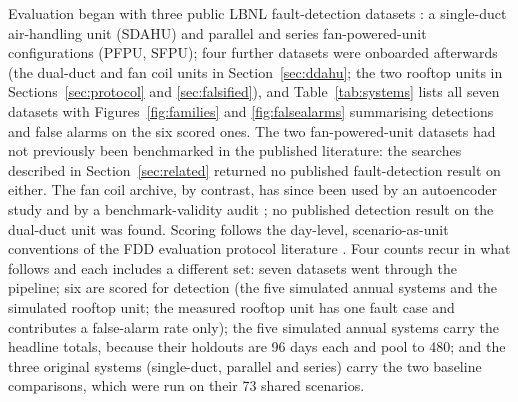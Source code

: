 \documentclass[11pt,letterpaper]{article}
\begin{document}
Evaluation began with three public LBNL fault-detection datasets \cite{granderson2020lbnlfdddata,granderson2023lbnlfdddata}: a single-duct air-handling unit (SDAHU) and parallel and series fan-powered-unit configurations (PFPU, SFPU); four further datasets were onboarded afterwards (the dual-duct and fan coil units in Section~\ref{sec:ddahu}; the two rooftop units in Sections~\ref{sec:protocol} and \ref{sec:falsified}), and Table~\ref{tab:systems} lists all seven datasets with Figures~\ref{fig:families} and \ref{fig:falsealarms} summarising detections and false alarms on the six scored ones. The two fan-powered-unit datasets had not previously been benchmarked in the published literature: the searches described in Section~\ref{sec:related} returned no published fault-detection result on either. The fan coil archive, by contrast, has since been used by an autoencoder study \cite{mahmoudan2025fcu} and by a benchmark-validity audit \cite{saydirasulov2026fcu}; no published detection result on the dual-duct unit was found. Scoring follows the day-level, scenario-as-unit conventions of the FDD evaluation protocol literature \cite{yuill2013fddprotocol,frank2018fddevaluation}. Four counts recur in what follows and each includes a different set: seven datasets went through the pipeline; six are scored for detection (the five simulated annual systems and the simulated rooftop unit; the measured rooftop unit has one fault case and contributes a false-alarm rate only); the five simulated annual systems carry the headline totals, because their holdouts are 96 days each and pool to 480; and the three original systems (single-duct, parallel and series) carry the two baseline comparisons, which were run on their 73 shared scenarios.
\end{document}
